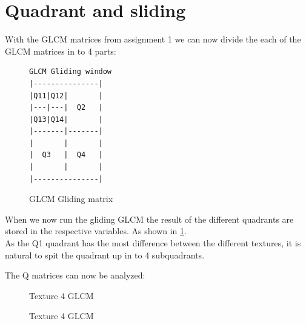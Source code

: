 \documentclass{article}
\begin{document}
\newpage
\section{Quadrant and sliding}
	With the GLCM matrices from assignment 1 we can now divide the each of the GLCM matrices in to 4 parts: 

	\begin{figure}[h]
	\centering
	\begin{BVerbatim}
GLCM Gliding window
|---------------|
|Q11|Q12|       |
|---|---|  Q2   |
|Q13|Q14|       |
|-------|-------|
|       |       |
|  Q3   |  Q4   |
|       |       |
|---------------|
	\end{BVerbatim}
	\caption{GLCM Gliding matrix}%
	\label{verb:gGLCM}
	\end{figure}


When we now run the gliding GLCM the result of the different quadrants are stored in the respective variables. As shown in \ref{verb:gGLCM}.\\

As the Q1 quadrant has the most difference between the different textures, it is natural to spit the quadrant up in to 4 subquadrants. 


\newpage
The Q matrices can now be analyzed: \\
	\begin{figure}[h]%
		\centering
    	\caption{Texture 4 GLCM}%
    	\label{fig:o1_f4}%
	\end{figure}

	\begin{figure}[h]%
		\centering
    	\caption{Texture 4 GLCM}%
    	\label{fig:o1_f4}%
	\end{figure}
\end{document}
